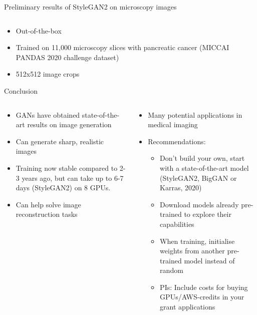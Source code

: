 \documentclass[8pt,xcolor=table,aspectratio=169]{beamer}
\begin{document}
\begin{frame}{Preliminary results of StyleGAN2 on microscopy images}
\begin{columns}
\begin{column}{0.5\textwidth}
\end{column}
\end{columns}

\begin{itemize}
\item Out-of-the-box
\item Trained on 11,000 microscopy slices with pancreatic cancer (MICCAI PANDAS 2020 challenge dataset)
\item 512x512 image crops
\end{itemize}
\vspace{1em}

\end{frame}

\begin{frame}{Conclusion}
\begin{columns}
\begin{column}{0.5\textwidth}
\begin{itemize}
\item GANs have obtained state-of-the-art results on image generation

\vspace{2em}

\item Can generate sharp, realistic images

\vspace{2em}

\item Training now stable compared to 2-3 years ago, but can take up to 6-7 days (StyleGAN2) on 8 GPUs. 

\vspace{2em}

\item Can help solve image reconstruction tasks 

\vspace{2em}

\end{itemize}
\end{column}
\begin{column}{0.5\textwidth}

\begin{itemize}
\item Many potential applications in medical imaging

\vspace{2em}

\item Recommendations:
\begin{itemize}
  \item Don't build your own, start with a state-of-the-art model (StyleGAN2, BigGAN or Karras, 2020)
  \item Download models already pre-trained to explore their capabilities
  \item When training, initialise weights from another pre-trained model instead of random
  \item PIs: Include costs for buying GPUs/AWS-credits in your grant applications 
\end{itemize}


\end{itemize}
\end{column}
\end{columns}
\end{frame}
\end{document}
